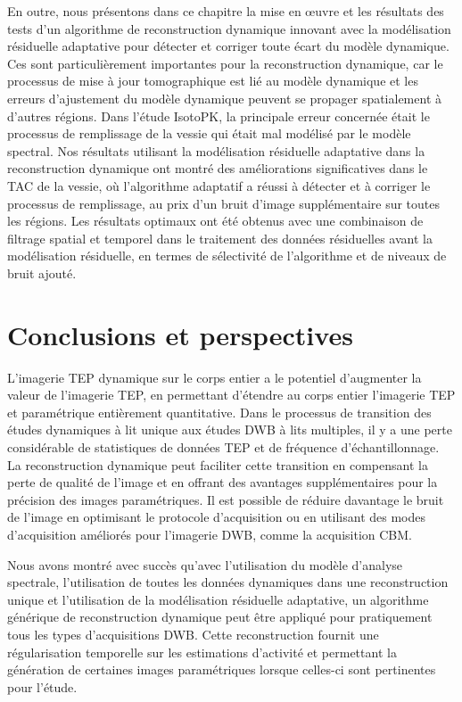 \documentclass[a4paper]{article}
\begin{document}
%
En outre, nous présentons dans ce chapitre la mise en œuvre et les résultats des tests d'un algorithme de reconstruction dynamique innovant avec la modélisation résiduelle adaptative pour détecter et corriger toute écart du modèle dynamique. Ces sont particulièrement importantes pour la reconstruction dynamique, car le processus de mise à jour tomographique est lié au modèle dynamique et les erreurs d'ajustement du modèle dynamique peuvent se propager spatialement à d'autres régions. 
Dans l'étude IsotoPK, la principale erreur concernée était le processus de remplissage de la vessie qui était mal modélisé par le modèle spectral.
Nos résultats utilisant la modélisation résiduelle adaptative dans la reconstruction dynamique ont montré des améliorations significatives dans le TAC de la vessie, où l'algorithme adaptatif a réussi à détecter et à corriger le processus de remplissage, au prix d'un bruit d'image supplémentaire sur toutes les régions. Les résultats optimaux ont été obtenus avec une combinaison de filtrage spatial et temporel dans le traitement des données résiduelles avant la modélisation résiduelle, en termes de sélectivité de l'algorithme et de niveaux de bruit ajouté. 

\section*{Conclusions et perspectives}
L'imagerie TEP dynamique sur le corps entier a le potentiel d'augmenter la valeur de l'imagerie TEP, en permettant d'étendre au corps entier l'imagerie TEP et paramétrique entièrement quantitative. 
Dans le processus de transition des études dynamiques à lit unique aux études DWB à lits multiples, il y a une perte considérable de statistiques de données TEP et de fréquence d'échantillonnage. La reconstruction dynamique peut faciliter cette transition en compensant la perte de qualité de l'image et en offrant des avantages supplémentaires pour la précision des images paramétriques. 
Il est possible de réduire davantage le bruit de l'image en optimisant le protocole d'acquisition ou en utilisant des modes d'acquisition améliorés pour l'imagerie DWB, comme la acquisition CBM. 

Nous avons montré avec succès qu'avec l'utilisation du modèle d'analyse spectrale, l'utilisation de toutes les données dynamiques dans une reconstruction unique et l'utilisation de la modélisation résiduelle adaptative, un algorithme générique de reconstruction dynamique peut être appliqué pour pratiquement tous les types d'acquisitions DWB. Cette reconstruction fournit une régularisation temporelle sur les estimations d'activité et permettant la génération de certaines images paramétriques lorsque celles-ci sont pertinentes pour l'étude.
\end{document}
